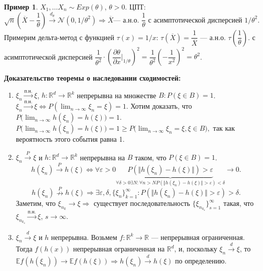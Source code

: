 \documentclass[12pt]{report}
\newcommand\setItemnumber[1]{\setcounter{enumi}{\numexpr#1-1\relax}}
\theoremstyle{definition}
\newtheorem{example}{Пример}
\begin{document}
\begin{example}
	$X_1,\dots X_n \sim Exp(\theta)$, $\theta > 0$. ЦПТ:
$$\sqrt{n}\left(\overline{X} - \dfrac{1}{\theta}\right) \xrightarrow{d_\theta} \mathcal{N}(0, 1/\theta^2) \Rightarrow \overline{X} \text{— а.н.о. } \frac{1}{\theta} \text{ с асимптотической дисперсией }1/\theta^2.$$
Примерим дельта-метод с функцией $\tau(x) = 1/x$: $\tau(\overline{X}) = \dfrac{1}{\overline{X}}$ — а.н.о. $\tau\left(\dfrac{1}{\theta}\right)$. с асимптотической дисперсией $\dfrac{1}{\theta^2}\cdot \left(\dfrac{\partial \theta}{\partial x}\Biggr\rvert_{1/\theta}\right)^2 = \dfrac{1}{\theta^2}\left(-\dfrac{1}{x^2}\right)^2 = \theta^2$.
\end{example}

\textbf{Доказательство теоремы о наследовании сходимостей:}\\
\begin{enumerate}
	\setItemnumber{2}
	\item $\xi_n\xrightarrow{п.н.} \xi$, $h:\mathbb{R}^d \rightarrow \mathbb{R}^k$ непрерывна на множестве $B:P(\xi \in B) = 1$. $\xi_n \xrightarrow{п. н.} \xi \Leftrightarrow P(\displaystyle{\lim_{n \to \infty} \xi_n = \xi}) = 1$. Хотим доказать, что $P(\displaystyle{\lim_{n \to \infty} h(\xi_n) =h(\xi)) = 1}$. $P(\displaystyle{\lim_{n \to \infty} h(\xi_n) =h(\xi)) = 1} \geqslant P(\displaystyle{\lim_{n \to \infty}\xi_n = \xi, \xi \in B)},$ так как вероятность этого события равна 1.
	\setItemnumber{1}
	\item $\xi_n \xrightarrow{P} \xi$ и $h : \mathbb{R}^d \rightarrow \mathbb{R}^k$ непрерывна на $B$ таком, что $P(\xi \in B) = 1$. 
	$$h(\xi_n) \xrightarrow{P} h(\xi) \Leftrightarrow \forall \varepsilon > 0 \underbrace{P(\Vert h(\xi_n) - h(\xi)\Vert) > \varepsilon}_{\forall \delta > 0 \exists N : \forall n > N P(\Vert h(\xi_n)-h(\xi)\Vert > \varepsilon) < \delta} \rightarrow 0.$$
	$$h(\xi_n) \stackrel{P}{\nrightarrow} h(\xi) \Rightarrow \exists \varepsilon, \delta, \{\xi_n\}_{k=1}^\infty : P(\Vert h(\xi_n) - h(\xi) \Vert > \varepsilon) > \delta.$$ 
	Заметим, что $\xi_{n_k} \rightarrow \xi \Rightarrow$ существует последовательность $\{\xi_{n_{k_s}}\}_{s=1}^\infty$ такая, что $\xi_{n_{k_s}} \xrightarrow{п. н.} \xi$, $s \rightarrow \infty$.
	\setItemnumber{3}
	\item $\xi_n \xrightarrow{d} \xi$ и $h$ непрерывна. Возьмем $f : \mathbb{R}^k \rightarrow \mathbb{R}$ — непрерывная ограниченная. Тогда $f(h(x))$ непрерывная ограниченная на $\mathbb{R}^d$, и, поскольку $\xi_n \xrightarrow{d} \xi$, то $\mathbb{E}f(h(\xi_n)) \rightarrow \mathbb{E}f(h(\xi)) \Rightarrow h(\xi_n) \xrightarrow{d} h(\xi)$ по определению. 

\end{enumerate}
\end{document}
